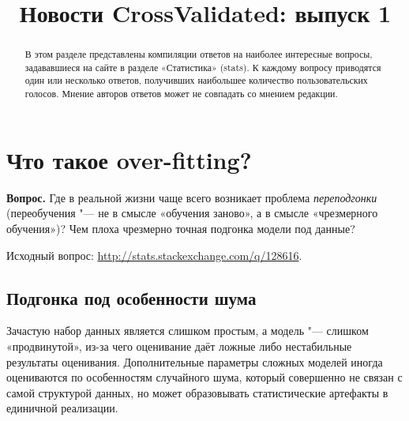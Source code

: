 \documentclass[final,pdftex]{../../template/epsilonj}
\begin{document}
\begin{frontmatter}
\title{Новости CrossValidated: выпуск 1}

\begin{aug}
\author{ }%



\address{НИУ ВШЭ, Москва.}
\end{aug}

\begin{abstract}
	В этом разделе представлены компиляции ответов на наиболее интересные вопросы, задававшиеся на сайте  в разделе «Статистика» (stats). К каждому вопросу приводятся один или несколько ответов, получивших наибольшее количество пользовательских голосов. Мнение авторов ответов может не совпадать со мнением редакции.
\end{abstract}

\begin{keyword}
\end{keyword}

\end{frontmatter}


\section{Что такое over-fitting?}

\textbf{Вопрос.} Где в реальной жизни чаще всего возникает проблема \textit{переподгонки} (переобучения "--- не в смысле «обучения заново», а в смысле «чрезмерного обучения»)? Чем плоха чрезмерно точная подгонка модели под данные?

Исходный вопрос: \url{http://stats.stackexchange.com/q/128616}.

\subsection{Подгонка под особенности шума}

Зачастую набор данных является слишком простым, а модель "--- слишком «продвинутой», из-за чего оценивание даёт ложные либо нестабильные результаты оценивания. Дополнительные параметры сложных моделей иногда оцениваются по особенностям случайного шума, который совершенно не связан с самой структурой данных, но может образовывать статистические артефакты в единичной реализации. 
\end{document}
